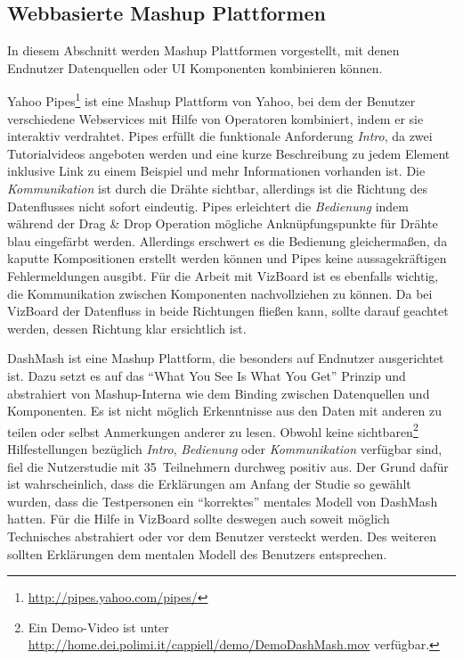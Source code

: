 \documentclass[
	headsepline,
	footsepline,
	fontsize=12pt,
	bibliography=totoc
]{scrbook}
\begin{document}
\subsection{Webbasierte Mashup Plattformen}
\label{section:standderforschung:verwandte_arbeiten:mashups}

In diesem Abschnitt werden Mashup Plattformen vorgestellt, mit denen Endnutzer Datenquellen oder UI Komponenten kombinieren können.


Yahoo Pipes\footnote{\url{http://pipes.yahoo.com/pipes/}} ist eine Mashup Plattform von Yahoo, bei dem der Benutzer verschiedene Webservices mit Hilfe von Operatoren kombiniert, indem er sie interaktiv verdrahtet.
Pipes erfüllt die funktionale Anforderung \emph{Intro}, da zwei Tutorialvideos angeboten werden und eine kurze Beschreibung zu jedem Element inklusive Link zu einem Beispiel und mehr Informationen vorhanden ist. Die \emph{Kommunikation} ist durch die Drähte sichtbar, allerdings ist die Richtung des Datenflusses nicht sofort eindeutig. Pipes erleichtert die \emph{Bedienung} indem während der Drag \& Drop Operation mögliche Anknüpfungspunkte für Drähte blau eingefärbt werden.
Allerdings erschwert es die Bedienung gleichermaßen, da kaputte Kompositionen erstellt werden können und Pipes keine aussagekräftigen Fehlermeldungen ausgibt.
Für die Arbeit mit VizBoard ist es ebenfalls wichtig, die Kommunikation zwischen Komponenten nachvollziehen zu können. Da bei VizBoard der Datenfluss in beide Richtungen fließen kann, sollte darauf geachtet werden, dessen Richtung klar ersichtlich ist.


DashMash \cite{Cappiello2011} ist eine Mashup Plattform, die besonders auf Endnutzer ausgerichtet ist. Dazu setzt es auf das \enquote{What You See Is What You Get} Prinzip und abstrahiert von Mashup-Interna wie dem Binding zwischen Datenquellen und Komponenten. Es ist nicht möglich Erkenntnisse aus den Daten mit anderen zu teilen oder selbst Anmerkungen anderer zu lesen. Obwohl keine sichtbaren\footnote{Ein Demo-Video ist unter \url{http://home.dei.polimi.it/cappiell/demo/DemoDashMash.mov} verfügbar.} Hilfestellungen bezüglich \emph{Intro}, \emph{Bedienung} oder \emph{Kommunikation} verfügbar sind, fiel die Nutzerstudie mit 35~Teilnehmern durchweg positiv aus. Der Grund dafür ist wahrscheinlich, dass die Erklärungen am Anfang der Studie so gewählt wurden, dass die Testpersonen ein \enquote{korrektes} mentales Modell von DashMash hatten. Für die Hilfe in VizBoard sollte deswegen auch soweit möglich Technisches abstrahiert oder vor dem Benutzer versteckt werden. Des weiteren sollten Erklärungen dem mentalen Modell des Benutzers entsprechen.
\end{document}
